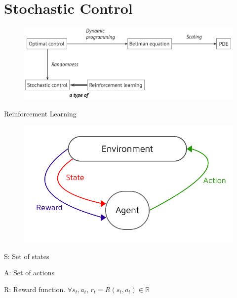 \documentclass{beamer}
\begin{document}
\section{Stochastic Control}

\begin{frame}
\begin{figure}
\includegraphics[scale  = 0.35]{figures/bellman_ml.pdf}
\end{figure}
\end{frame}


\begin{frame}{Reinforcement Learning}
\begin{figure}
\includegraphics[scale = 0.3]{reinforcementlearning}
\end{figure}
S: Set of states

A: Set of actions

R: Reward function. $\forall s_t,a_t$, $r_t = R(s_t,a_t)\in \mathbb{R}$

  
\end{frame}
\end{document}
